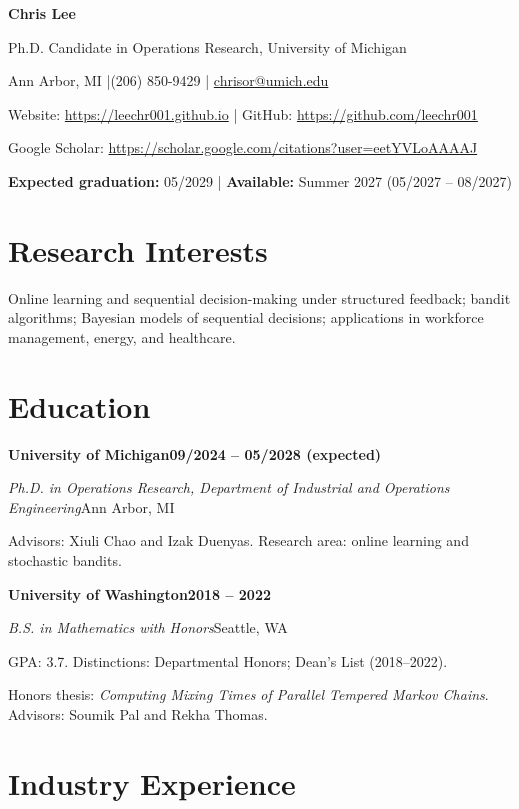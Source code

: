 \documentclass[10pt,letterpaper]{article}
\newcommand{\entry}[4]{%
  \textbf{#1}\hfill\textbf{#2}\par
  \emph{#3}\hfill #4\par
}
\begin{document}
{\Huge\bfseries Chris Lee}\par
\vspace{0.3em}
{\large Ph.D. Candidate in Operations Research, University of Michigan}\par
\vspace{0.3em}
Ann Arbor, MI \enspace|\enspace (206) 850-9429 \enspace|\enspace
\href{mailto:chrisor@umich.edu}{chrisor@umich.edu}\par
Website: \url{https://leechr001.github.io}
\enspace|\enspace
GitHub: \url{https://github.com/leechr001}\par
Google Scholar:
\url{https://scholar.google.com/citations?user=eetYVLoAAAAJ}\par
\vspace{0.2em}
\textbf{Expected graduation:} 05/2029
\enspace|\enspace
\textbf{Available:} Summer 2027 (05/2027 -- 08/2027)\par

\section*{Research Interests}

Online learning and sequential decision-making under structured feedback;
bandit algorithms; Bayesian models of sequential decisions; applications in
workforce management, energy, and healthcare.

\section*{Education}

\entry
  {University of Michigan}
  {09/2024 -- 05/2028 (expected)}
  {Ph.D. in Operations Research, Department of Industrial and Operations Engineering}
  {Ann Arbor, MI}
Advisors: Xiuli Chao and Izak Duenyas. Research area: online learning and
stochastic bandits.\par

\vspace{0.45em}
\entry
  {University of Washington}
  {2018 -- 2022}
  {B.S. in Mathematics with Honors}
  {Seattle, WA}
GPA: 3.7. Distinctions: Departmental Honors; Dean's List (2018--2022).\par
Honors thesis: \emph{Computing Mixing Times of Parallel Tempered Markov
Chains}. Advisors: Soumik Pal and Rekha Thomas.\par

\section*{Industry Experience}
\end{document}
